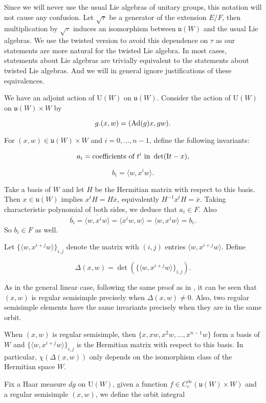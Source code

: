 \documentclass[11pt, oneside,reqno]{amsart}   	%
\begin{document}
Since we will never use the usual Lie algebras of unitary groups, this notation will not cause any confusion. Let $\sqrt{\tau}$ be a generator of the extension $E/F$, then multiplication by $\sqrt{\tau}$ induces an isomorphism between $\mathfrak{u}(W)$ and the usual Lie algebras. We use the twisted version to avoid this dependence on $\tau$ as our statements are more natural for the twisted Lie algebra. In most cases, statements about Lie algebras are trivially equivalent to the statements about twisted Lie algebras. And we will in general ignore justifications of these equivalences. 

We have an adjoint action of U$(W)$ on $\mathfrak{u}(W)$. Consider the action of U$(W)$ on $\mathfrak{u}(W) \times W$ by

$$g.(x,w)=(\textup{Ad}(g)x,gw).$$

For $(x,w) \in \mathfrak{u}(W) \times W$ and $i=0,...,n-1$, define the following invariants:

$$a_i=\textup{coefficients of }t^i \textup{ in }\det(\textup{I}t- x),$$

$$b_i=\langle w, x^iw\rangle.$$

Take a basis of $W$ and let $H$ be the Hermitian matrix with respect to this basis. Then $x \in \mathfrak{u}(W)$ implies $x^tH=H \overline{x}$, equivalently $H^{-1}x^tH=\overline{x}$. Taking characteristic polynomial of both sides, we deduce that $a_i \in F$. Also $$\overline{b_i}=\overline{\langle w, x^iw\rangle}=\langle  x^iw,w \rangle=\langle w, x^iw\rangle=b_i.$$
So $b_i \in F$ as well.




Let $\{\langle w,x^{i+j}w\rangle\}_{i,j}$ denote the matrix with $(i,j)$ entries $\langle w,x^{i+j}w\rangle$. Define

$$\Delta(x,w)=\det(\{\langle w,x^{i+j}w\rangle\}_{i,j}).$$

As in the general linear case, following the same proof as in \cite{Rallis1}, it can be seen that $(x,w)$ is regular semisimple precisely when $\Delta(x,w)\neq 0$. Also, two regular semisimple elements have the same invariants precisely when they are in the same orbit.

When $(x,w)$ is regular semisimple, then $\{x,xw,x^2w,...,x^{n-1}w\}$ form a basis of $W$ and $\{\langle w,x^{i+j}w\rangle\}_{i,j}$ is the Hermitian matrix with respect to this basis. In particular, $\chi(\Delta(x,w))$ only depends on the isomorphism class of the Hermitian space $W$.

Fix a Haar measure $dg$ on U$(W)$, given a function $f \in C_c^\infty(\mathfrak{u}(W)\times W)$ and a regular semisimple $(x,w)$, we define the orbit integral
\end{document}
